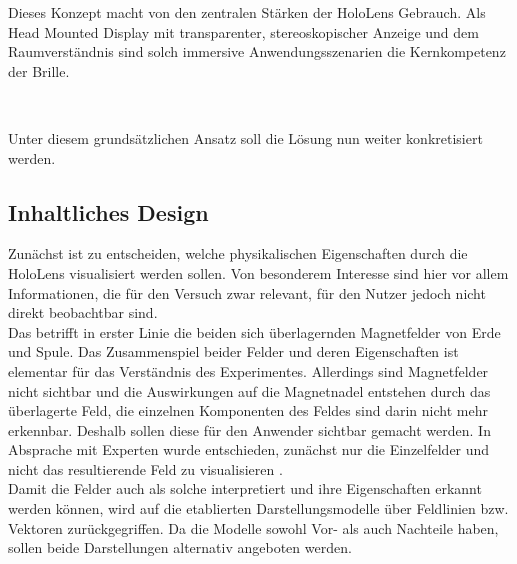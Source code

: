 Dieses Konzept macht von den zentralen Stärken der HoloLens Gebrauch. Als Head Mounted Display mit transparenter, stereoskopischer Anzeige und dem Raumverständnis sind solch immersive Anwendungsszenarien die Kernkompetenz der Brille. 

\vspace{8px}
\begin{center}
	\\
\end{center}
\vspace{6px}


Unter diesem grundsätzlichen Ansatz soll die Lösung nun weiter konkretisiert werden.


\subsection{Inhaltliches Design} %
Zunächst ist zu entscheiden, welche physikalischen Eigenschaften durch die HoloLens visualisiert werden sollen. Von besonderem Interesse sind hier vor allem Informationen, die für den Versuch zwar relevant, für den Nutzer jedoch nicht direkt beobachtbar sind.\\

Das betrifft in erster Linie die beiden sich überlagernden Magnetfelder von Erde und Spule. Das Zusammenspiel beider Felder und deren Eigenschaften ist elementar für das Verständnis des Experimentes. Allerdings sind Magnetfelder nicht sichtbar und die Auswirkungen auf die Magnetnadel entstehen durch das überlagerte Feld, die einzelnen Komponenten des Feldes sind darin nicht mehr erkennbar. Deshalb sollen diese für den Anwender sichtbar gemacht werden. In Absprache mit Experten wurde entschieden, zunächst nur die Einzelfelder und nicht das resultierende Feld zu visualisieren \autocite{Reinholz18}.\\
\noindent\hspace*{5mm}
Damit die Felder auch als solche interpretiert und ihre Eigenschaften erkannt werden können, wird auf die etablierten Darstellungsmodelle über Feldlinien bzw. Vektoren zurückgegriffen. Da die Modelle sowohl Vor- als auch Nachteile haben, sollen beide Darstellungen alternativ angeboten werden.\\

